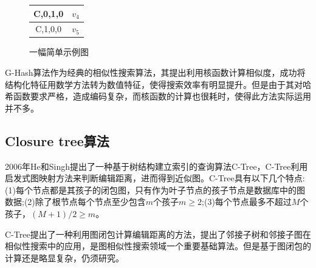 \documentclass{XDBAthesis}
\begin{document}
\begin{figure}[htb]
{\begin{minipage}{0.5\textwidth}
\begin{tabular}{c|c}
                    C,0,1,0 & $v_{4}$ \\ \hline
                    C,1,0,0 & $v_{5}$ \\ \hline
                \end{tabular}
            \end{minipage}
            }
            \caption{一幅简单示例图}
            \label{fg:ghash_index}
        \end{figure}     


    

G-Hash算法作为经典的相似性搜索算法，其提出利用核函数计算相似度，成功将结构化特征用数学方法转为数值特征，使得搜索效率有明显提升。但是由于其对哈希函数要求严格，造成编码复杂，而核函数的计算也很耗时，使得此方法实际运用并不多。

\subsection{Closure tree算法}
2006年He和Singh提出了一种基于树结构建立索引的查询算法C-Tree\cite{C-Tree}，C-Tree利用启发式图映射方法来判断编辑距离，进而得到近似图。C-Tree具有以下几个特点\cite{DTS}:(1)每个节点都是其孩子的闭包图，只有作为叶子节点的孩子节点是数据库中的图数据;(2)除了根节点每个节点至少包含$m$个孩子$m\geq 2$;(3)每个节点最多不超过$M$个孩子，$(M+1)/2\geq m$。

C-Tree提出了一种利用图闭包计算编辑距离的方法，提出了邻接子树和邻接子图在相似性搜索中的应用，是图相似性搜索领域一个重要基础算法。但是基于图闭包的计算还是略显复杂，仍须研究。

\ifx\allfiles\undefined


\end{document}

